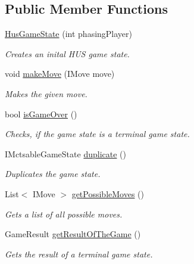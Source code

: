 \subsection*{Public Member Functions}
\begin{DoxyCompactItemize}
\item 
\mbox{\hyperlink{class_hus_1_1_hus_game_state_ac27c230e200f6c857cd8187c5ffd4cb3}{Hus\+Game\+State}} (int phasing\+Player)
\begin{DoxyCompactList}\small\item\em Creates an inital H\+US game state. \end{DoxyCompactList}\item 
void \mbox{\hyperlink{class_hus_1_1_hus_game_state_a32512f6800dd87707960a5d8ba230abd}{make\+Move}} (I\+Move move)
\begin{DoxyCompactList}\small\item\em Makes the given move. \end{DoxyCompactList}\item 
bool \mbox{\hyperlink{class_hus_1_1_hus_game_state_a9b64d987dbc11c7b6d7035eb9613c633}{is\+Game\+Over}} ()
\begin{DoxyCompactList}\small\item\em Checks, if the game state is a terminal game state. \end{DoxyCompactList}\item 
I\+Mctsable\+Game\+State \mbox{\hyperlink{class_hus_1_1_hus_game_state_ad519755bf09bbc5d4da38aceb3dd27b4}{duplicate}} ()
\begin{DoxyCompactList}\small\item\em Duplicates the game state. \end{DoxyCompactList}\item 
List$<$ I\+Move $>$ \mbox{\hyperlink{class_hus_1_1_hus_game_state_a9fb13d159808e73e86e0c12b4e0dee67}{get\+Possible\+Moves}} ()
\begin{DoxyCompactList}\small\item\em Gets a list of all possible moves. \end{DoxyCompactList}\item 
Game\+Result \mbox{\hyperlink{class_hus_1_1_hus_game_state_aa42355269a96c5df1b46d031548d6e0a}{get\+Result\+Of\+The\+Game}} ()
\begin{DoxyCompactList}\small\item\em Gets the result of a terminal game state. \end{DoxyCompactList}\end{DoxyCompactItemize}
